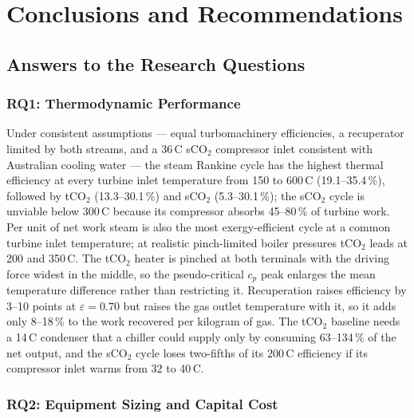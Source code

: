 \chapter{Conclusions and Recommendations}
\label{ch:conclusions}

\section{Answers to the Research Questions}
\label{sec:answers}

\subsection{RQ1: Thermodynamic Performance}

Under consistent assumptions --- equal turbomachinery efficiencies, a
recuperator limited by both streams, and a 36\,\textdegree C sCO$_2$
compressor inlet consistent with Australian cooling water --- the steam
Rankine cycle has the highest thermal efficiency at every turbine inlet
temperature from 150 to 600\,\textdegree C (19.1--35.4\,\%), followed by
tCO$_2$ (13.3--30.1\,\%) and sCO$_2$ (5.3--30.1\,\%); the sCO$_2$ cycle is
unviable below 300\,\textdegree C because its compressor absorbs 45--80\,\%
of turbine work. Per unit of net work steam is also the most
exergy-efficient cycle at a common turbine inlet temperature; at realistic
pinch-limited boiler pressures tCO$_2$ leads at 200 and 350\,\textdegree C.
The tCO$_2$ heater is pinched at both terminals with the driving force
widest in the middle, so the pseudo-critical $c_p$ peak enlarges the mean
temperature difference rather than restricting it. Recuperation raises
efficiency by 3--10 points at $\varepsilon = 0.70$ but raises the gas outlet
temperature with it, so it adds only 8--18\,\% to the work recovered per
kilogram of gas. The tCO$_2$ baseline needs a 14\,\textdegree C condenser
that a chiller could supply only by consuming 63--134\,\% of the net
output, and the sCO$_2$ cycle loses two-fifths of its 200\,\textdegree C
efficiency if its compressor inlet warms from 32 to 40\,\textdegree C.

\subsection{RQ2: Equipment Sizing and Capital Cost}

